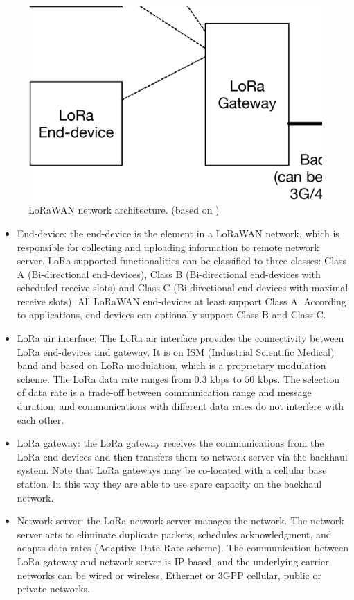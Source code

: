 \begin{figure}[!t]
	\centering
	\includegraphics[width=0.9\linewidth]{Chapter2/Figures/Lora-net-arch}
	\caption{LoRaWAN network architecture. (based on \cite{lora/specification})}
	\label{fig:lora-net-arch}
\end{figure}
\begin{itemize}[leftmargin=*]
	\item End-device: the end-device is the element in a LoRaWAN network, which is responsible for collecting and uploading information to remote network server. LoRa supported functionalities can be classified to three classes: Class A (Bi-directional end-devices), Class B (Bi-directional end-devices with scheduled receive slots) and Class C (Bi-directional end-devices with maximal receive slots). All LoRaWAN end-devices at least support Class A. According to applications, end-devices can optionally support Class B and Class C.
	\item LoRa air interface: The LoRa air interface provides the connectivity between LoRa end-devices and gateway. It is on ISM (Industrial Scientific Medical) band and based on LoRa modulation, which is a proprietary modulation scheme. The LoRa data rate ranges from $0.3$ kbps to $50$ kbps. The selection of data rate is a trade-off between
	communication range and message duration, and communications with different data rates do
	not interfere with each other. 
	\item LoRa gateway: the LoRa gateway receives the communications from the LoRa end-devices and then transfers them to network server via the backhaul system. Note that LoRa gateways may be co-located with a cellular base station. In this way they are able to use spare capacity on the backhaul network.
	\item Network server:  the LoRa network server manages the network. The network server acts to eliminate duplicate packets, schedules acknowledgment, and adapts data rates (Adaptive Data Rate scheme). The communication between LoRa gateway and network server is IP-based, and the underlying carrier networks can be wired or wireless,  Ethernet or 3GPP cellular, public or private networks.
\end{itemize}

